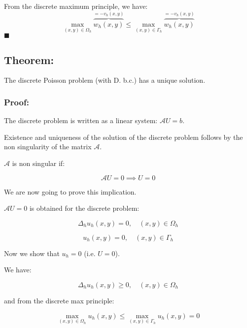 From the discrete maximum principle, we have:
\begin{equation*}
\max_{(x, y) \in \Omega_h} \overbrace{w_h (x, y)}^{= - v_h(x, y)} \le \max_{(x, y) \in \Gamma_h} \overbrace{w_h (x, y)}^{= - v_h(x, y)}
\end{equation*}
$\blacksquare$

\subsection{Theorem:}

The discrete Poisson problem (with D. b.c.) has a unique solution.

\subsubsection{Proof:}

The discrete problem is written as a linear system: $\mathcal{A} U = b$.

Existence and uniqueness of the solution of the discrete problem follows by the non singularity of the matrix $\mathcal{A}$.

$\mathcal{A}$ is non singular if:

\begin{equation*}
\mathcal{A} U = 0 \implies U = 0
\end{equation*}

We are now going to prove this implication.

$\mathcal{A} U = 0$ is obtained for the discrete problem:


\begin{equation*}
\Delta_h u_h(x, y) = 0, \quad (x, y) \in \Omega_h
\end{equation*}

\begin{equation*}
u_h(x, y) = 0, \quad (x, y) \in \Gamma_h
\end{equation*}

Now we show that $u_h = 0$ (i.e. $U = 0$).

We have:

\begin{equation*}
\Delta_h u_h(x, y) \ge 0, \quad (x, y) \in \Omega_h
\end{equation*}

and from the discrete max principle:

\begin{equation*}
\max_{(x, y) \in \Omega_h} u_h(x, y) \le \max_{(x, y) \in \Gamma_h} u_h(x, y) = 0
\end{equation*}

